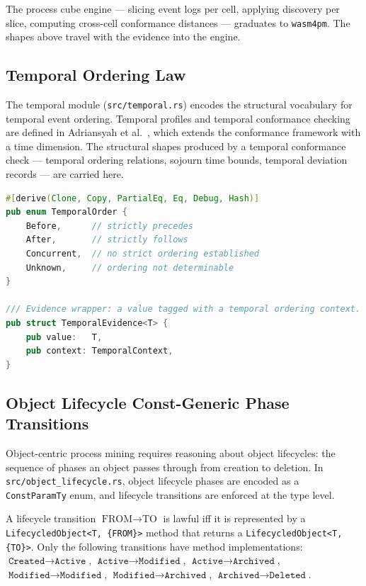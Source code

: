 The process cube engine --- slicing event logs per cell, applying discovery per slice,
computing cross-cell conformance distances --- graduates to \texttt{wasm4pm}. The shapes
above travel with the evidence into the engine.

\subsection{Temporal Ordering Law}

The temporal module (\texttt{src/temporal.rs}) encodes the structural vocabulary for
temporal event ordering. Temporal profiles and temporal conformance checking are defined
in Adriansyah et al.~\cite{adriansyah2015measuring}, which extends the conformance
framework with a time dimension. The structural shapes produced by a temporal conformance
check --- temporal ordering relations, sojourn time bounds, temporal deviation records --- are
carried here.

\begin{lstlisting}[language=Rust,
  caption={\texttt{TemporalOrder}: the four canonical temporal relations. Deriving the
    ordering from event timestamps graduates to \texttt{wasm4pm}.},
  label={lst:temporal-order}]
#[derive(Clone, Copy, PartialEq, Eq, Debug, Hash)]
pub enum TemporalOrder {
    Before,      // strictly precedes
    After,       // strictly follows
    Concurrent,  // no strict ordering established
    Unknown,     // ordering not determinable
}

/// Evidence wrapper: a value tagged with a temporal ordering context.
pub struct TemporalEvidence<T> {
    pub value:   T,
    pub context: TemporalContext,
}
\end{lstlisting}

\subsection{Object Lifecycle Const-Generic Phase Transitions}

Object-centric process mining requires reasoning about object lifecycles: the sequence of
phases an object passes through from creation to deletion. In \texttt{src/object\_lifecycle.rs},
object lifecycle phases are encoded as a \texttt{ConstParamTy} enum, and lifecycle
transitions are enforced at the type level.

\begin{definition}
\label{def:lifecycle-transition}
A lifecycle transition $\text{FROM} \to \text{TO}$ is lawful iff it is represented by a
\texttt{LifecycledObject<T, \{FROM\}>} method that returns a
\texttt{LifecycledObject<T, \{TO\}>}. Only the following transitions have method
implementations: $\texttt{Created} \to \texttt{Active}$, $\texttt{Active} \to
\texttt{Modified}$, $\texttt{Active} \to \texttt{Archived}$, $\texttt{Modified} \to
\texttt{Modified}$, $\texttt{Modified} \to \texttt{Archived}$, $\texttt{Archived} \to
\texttt{Deleted}$.
\end{definition}

